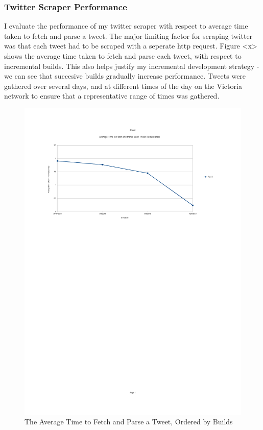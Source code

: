 \subsubsection{Twitter Scraper Performance}
I evaluate the performance of my twitter scraper with respect to average time taken to fetch and parse a tweet. The major limiting factor for scraping twitter was that each tweet had to be scraped with a seperate http request. Figure <x> shows the average time taken to fetch and parse each tweet, with respect to incremental builds. This also helps justify my incremental development strategy - we can see that succesive builds gradually increase performance. Tweets were gathered over several days, and at different times of the day on the Victoria network to ensure that a representative range of times was gathered. 

\begin{figure}[h!]
\centering
\includegraphics{Images/average_time_to_fetch_parse_tweets_per_build.pdf}
\caption{The Average Time to Fetch and Parse a Tweet, Ordered by Builds}
\end{figure}

